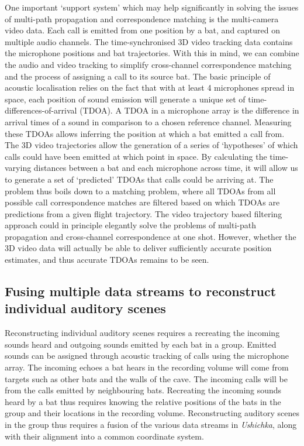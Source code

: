 \documentclass[
]{book}
\begin{document}
\begin{enumerate}
\end{enumerate}

One important `support system' which may help significantly in solving the issues of multi-path propagation and correspondence matching is the multi-camera video data. Each call is emitted from one position by a bat, and captured on multiple audio channels. The time-synchronised 3D video tracking data contains the microphone positions and bat trajectories. With this in mind, we can combine the audio and video tracking to simplify cross-channel correspondence matching and the process of assigning a call to its source bat. The basic principle of acoustic localisation relies on the fact that with at least 4 microphones spread in space, each position of sound emission will generate a unique set of time-differences-of-arrival (TDOA). A TDOA in a microphone array is the difference in arrival times of a sound in comparison to a chosen reference channel. Measuring these TDOAs allows inferring the position at which a bat emitted a call from. The 3D video trajectories allow the generation of a series of `hypotheses' of which calls could have been emitted at which point in space. By calculating the time-varying distances between a bat and each microphone across time, it will allow us to generate a set of `predicted' TDOAs that calls could be arriving at. The problem thus boils down to a matching problem, where all TDOAs from all possible call correspondence matches are filtered based on which TDOAs are predictions from a given flight trajectory. The video trajectory based filtering approach could in principle elegantly solve the problems of multi-path propagation and cross-channel correspondence at one shot. However, whether the 3D video data will actually be able to deliver sufficiently accurate position estimates, and thus accurate TDOAs remains to be seen.

\hypertarget{fusing-multiple-data-streams-to-reconstruct-individual-auditory-scenes}{%
\subsection{Fusing multiple data streams to reconstruct individual auditory scenes}\label{fusing-multiple-data-streams-to-reconstruct-individual-auditory-scenes}}

Reconstructing individual auditory scenes requires a recreating the incoming sounds heard and outgoing sounds emitted by each bat in a group. Emitted sounds can be assigned through acoustic tracking of calls using the microphone array. The incoming echoes a bat hears in the recording volume will come from targets such as other bats and the walls of the cave. The incoming calls will be from the calls emitted by neighbouring bats. Recreating the incoming sounds heard by a bat thus requires knowing the relative positions of the bats in the group and their locations in the recording volume. Reconstructing auditory scenes in the group thus requires a fusion of the various data streams in \emph{Ushichka}, along with their alignment into a common coordinate system.
\end{document}
